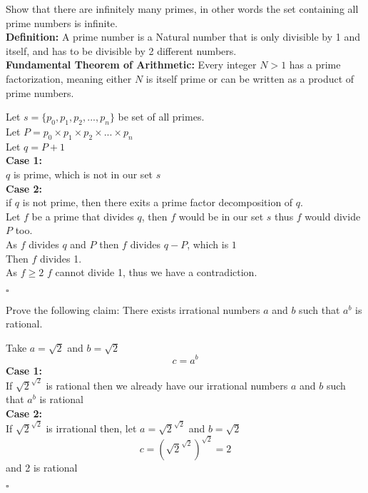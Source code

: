 \documentclass{exam}
\begin{document}
\begin{questions}
    \question Show that there are infinitely many primes, in other words the set containing all prime numbers is infinite.
    \\\textbf{Definition:} A prime number is a Natural number that is only divisible by 1 and itself, and has to be divisible by 2 different numbers.
    \\\textbf{Fundamental Theorem of Arithmetic:} Every integer $N > 1$ has a prime factorization, meaning either $N$ is itself prime or can be written as a product of prime numbers.
    \begin{solution}
        Let $s=\{p_0,p_1,p_2,...,p_n\}$ be set of all primes. 
        \\Let $P = p_0 \times p_1 \times p_2 \times ... \times p_n$
        \\Let $q = P+1$
        \\\textbf{Case 1:}
        \\$q$ is prime, which is not in our set $s$
        \\\textbf{Case 2:} 
        \\if $q$ is not prime, then there exits a prime factor decomposition of $q$.
        \\Let $f$ be a prime that divides $q$, then $f$ would be in our set $s$ thus $f$ would divide $P$ too. 
        \\As $f$ divides $q$ and $P$ then $f$ divides $q-P$, which is $1$
        \\Then $f$ divides 1.
        \\As $f\geq2$ $f$ cannot divide 1, thus we have a contradiction.
        \begin{flushright}
            $\square$
        \end{flushright}
    \end{solution}

    \question Prove the following claim: There exists irrational numbers $a$ and $b$ such that $a^b$ is rational.
    \begin{solution}
        Take $a = \sqrt{2}$ and $b = \sqrt{2}$
        $$c = a^b$$
        \textbf{Case 1:}
        \\If $\sqrt{2} ^{\sqrt{2}}$ is rational then we already have our irrational numbers $a$ and $b$ such that $a^b$ is rational
        \\\textbf{Case 2:}
        \\If $\sqrt{2} ^{\sqrt{2}}$ is irrational then, let $a = \sqrt{2} ^{\sqrt{2}}$ and $b = \sqrt{2}$
        $$c = \left(\sqrt{2} ^{\sqrt{2}}\right)^{\sqrt{2}} = 2$$
        and 2 is rational
        \begin{flushright}
            $\square$
        \end{flushright}
    \end{solution}


\end{questions}
\end{document}
